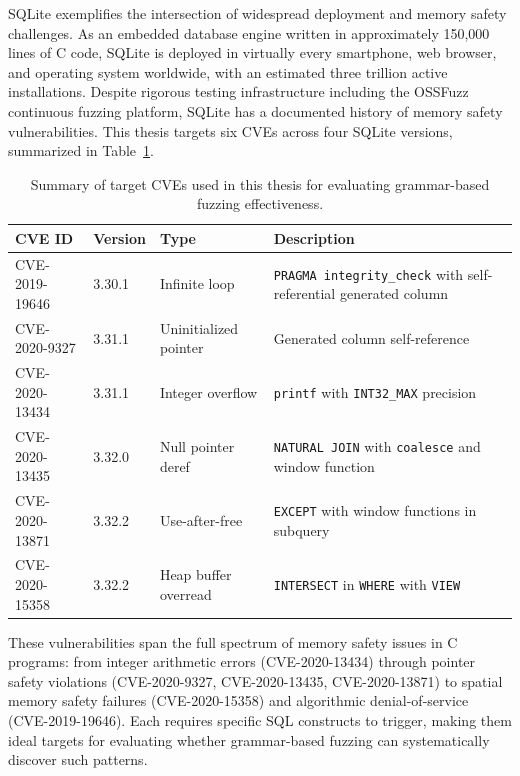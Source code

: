 SQLite \cite{sqlite} exemplifies the intersection of widespread deployment and memory safety challenges. As an embedded database engine written in approximately 150,000 lines of C code, SQLite is deployed in virtually every smartphone, web browser, and operating system worldwide, with an estimated three trillion active installations. Despite rigorous testing infrastructure including the OSSFuzz continuous fuzzing platform, SQLite has a documented history of memory safety vulnerabilities. This thesis targets six CVEs across four SQLite versions, summarized in Table~\ref{tab:target-cves}.

\begin{table}[H]
\centering
\caption{Summary of target CVEs used in this thesis for evaluating grammar-based fuzzing effectiveness.}
\label{tab:target-cves}
\begin{tabular}{@{}llll@{}}
\toprule
\textbf{CVE ID} & \textbf{Version} & \textbf{Type} & \textbf{Description} \\
\midrule
CVE-2019-19646 \cite{cve201919646} & 3.30.1 & Infinite loop & \texttt{PRAGMA integrity\_check} with self-referential generated column \\
CVE-2020-9327 \cite{cve20209327} & 3.31.1 & Uninitialized pointer & Generated column self-reference \\
CVE-2020-13434 \cite{cve202013434} & 3.31.1 & Integer overflow & \texttt{printf} with \texttt{INT32\_MAX} precision \\
CVE-2020-13435 \cite{cve202013435} & 3.32.0 & Null pointer deref & \texttt{NATURAL JOIN} with \texttt{coalesce} and window function \\
CVE-2020-13871 \cite{cve202013871} & 3.32.2 & Use-after-free & \texttt{EXCEPT} with window functions in subquery \\
CVE-2020-15358 \cite{cve202015358} & 3.32.2 & Heap buffer overread & \texttt{INTERSECT} in \texttt{WHERE} with \texttt{VIEW} \\
\bottomrule
\end{tabular}
\end{table}

These vulnerabilities span the full spectrum of memory safety issues in C programs: from integer arithmetic errors (CVE-2020-13434) through pointer safety violations (CVE-2020-9327, CVE-2020-13435, CVE-2020-13871) to spatial memory safety failures (CVE-2020-15358) and algorithmic denial-of-service (CVE-2019-19646). Each requires specific SQL constructs to trigger, making them ideal targets for evaluating whether grammar-based fuzzing can systematically discover such patterns.

